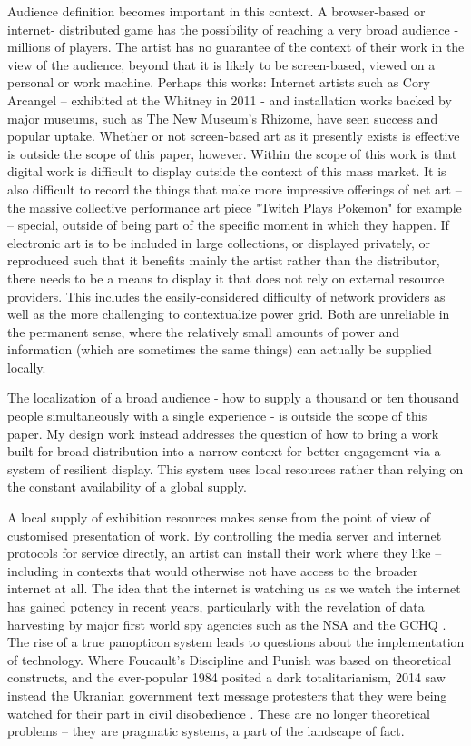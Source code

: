 Audience definition becomes important in this context. A browser-based or internet- distributed game has the possibility of reaching a very broad audience - millions of players. The artist has no guarantee of the context of their work in the view of the audience, beyond that it is likely to be screen-based, viewed on a personal or work machine. Perhaps this works: Internet artists such as Cory Arcangel – exhibited at the Whitney in 2011 - and installation works backed by major museums, such as The New Museum's Rhizome, have seen success and popular uptake. Whether or not screen-based art as it presently exists is effective is outside the scope of this paper, however. Within the scope of this work is that digital work is difficult to display outside the context of this mass market. It is also difficult to record the things that make more impressive offerings of net art – the massive collective performance art piece "Twitch Plays Pokemon" \parencite{twitchplayspokemon} for example – special, outside of being part of the specific moment in which they happen. If electronic art is to be included in large collections, or displayed privately, or reproduced such that it benefits mainly the artist rather than the distributor, there needs to be a means to display it that does not rely on external resource providers. This includes the easily-considered difficulty of network providers as well as the more challenging to contextualize power grid. Both are unreliable in the permanent sense, where the relatively small amounts of power and information (which are sometimes the same things) can actually be supplied locally.

The localization of a broad audience - how to supply a thousand or ten thousand people simultaneously with a single experience - is outside the scope of this paper. My design work instead addresses the question of how to bring a work built for broad distribution into a narrow context for better engagement via a system of resilient display. This system uses local resources rather than relying on the constant availability of a global supply.

A local supply of exhibition resources makes sense from the point of view of customised presentation of work. By controlling the media server and internet protocols for service directly, an artist can install their work where they like – including in contexts that would otherwise not have access to the broader internet at all. The idea that the internet is watching us as we watch the internet has gained potency in recent years, particularly with the revelation of data harvesting by major first world spy agencies such as the NSA and the GCHQ \parencite{guardiangchq}. The rise of a true panopticon system leads to questions about the implementation of technology. Where Foucault's Discipline and Punish was based on theoretical constructs, and the ever-popular 1984 posited a dark totalitarianism, 2014 saw instead the Ukranian government text message protesters that they were being watched for their part in civil disobedience \parencite{viceukraine}. These are no longer theoretical problems – they are pragmatic systems, a part of the landscape of fact.


